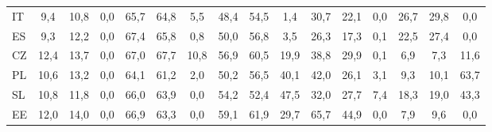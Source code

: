 \begin{table}[htbp]
\begin{tabular}{lccccccccccccccc}
IT &       9,4 &      10,8 &       0,0 &      65,7 &      64,8 &       5,5 &      48,4 &      54,5 &       1,4 &      30,7 &      22,1 &       0,0 &      26,7 &      29,8 &       0,0 \\  
ES &       9,3 &      12,2 &       0,0 &      67,4 &      65,8 &       0,8 &      50,0 &      56,8 &       3,5 &      26,3 &      17,3 &       0,1 &      22,5 &      27,4 &       0,0 \\  
CZ &      12,4 &      13,7 &       0,0 &      67,0 &      67,7 &      10,8 &      56,9 &      60,5 &      19,9 &      38,8 &      29,9 &       0,1 &       6,9 &       7,3 &      11,6 \\  
PL &      10,6 &      13,2 &       0,0 &      64,1 &      61,2 &       2,0 &      50,2 &      56,5 &      40,1 &      42,0 &      26,1 &       3,1 &       9,3 &      10,1 &      63,7 \\  
SL &      10,8 &      11,8 &       0,0 &      66,0 &      63,9 &       0,0 &      54,2 &      52,4 &      47,5 &      32,0 &      27,7 &       7,4 &      18,3 &      19,0 &      43,3 \\  
EE &      12,0 &      14,0 &       0,0 &      66,9 &      63,3 &       0,0 &      59,1 &      61,9 &      29,7 &      65,7 &      44,9 &       0,0 &       7,9 &       9,6 &       0,0 \\  
\hline \hline \end{tabular}
\end{table}
